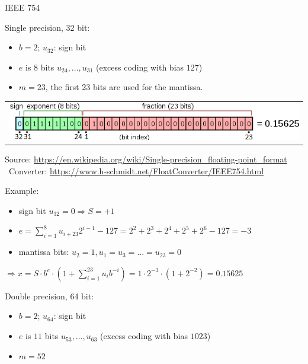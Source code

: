 \begin{vbframe}{IEEE 754}

Single precision, 32 bit:
\begin{itemize}
  \item $b = 2$; $u_{32}$: sign bit
  \item $e$ is $8$ bits $u_{24}, ..., u_{31}$ (excess coding with bias $127$)
  \item $m = 23$, the first 23 bits are used for the mantissa.
\end{itemize}

\begin{center}
\begin{tabular}{l}
  \includegraphics{figure_man/32bit_new} \\[0.15cm]
\end{tabular}
{\scriptsize
Source: \url{https://en.wikipedia.org/wiki/Single-precision_floating-point_format}\\\
Converter: \url{https://www.h-schmidt.net/FloatConverter/IEEE754.html}
}
\end{center}

Example:
\begin{itemize}
  \item sign bit $u_{32} = 0 \Rightarrow S = +1$
  \item $e = \sum_{i=1}^{8} u_{i+23} 2^{i-1} - 127 = 2^2 + 2^3+ 2^4+ 2^5 + 2^6 - 127 = -3$
  \item mantissa bits: $u_2 = 1, u_1=u_3=...=u_{23}=0$
\end{itemize}


$\Rightarrow x = S \cdot b^e \cdot (1 + \sum_{i=1}^{23} u_{i} b^{-i}) = 1 \cdot 2^{-3} \cdot (1 + 2^{-2}) = 0.15625$

\framebreak

Double precision, 64 bit:
\begin{itemize}
  \item $b = 2$; $u_{64}$: sign bit
  \item $e$ is $11$ bits $u_{53}, ..., u_{63}$ (excess coding with bias $1023$)
  \item $m = 52$
\end{itemize}



\end{vbframe}
